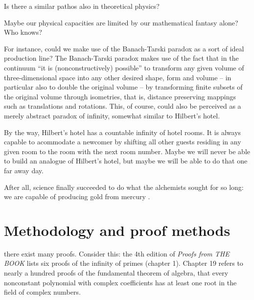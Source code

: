 Is there a similar pathos also in theoretical physics?

Maybe our physical capacities are limited by our mathematical fantasy alone?
Who knows?

For instance, could we make use of the Banach-Tarski paradox \cite{springerlink:10.1007/BF03023740,wagon1}
as a sort of ideal production line?
The Banach-Tarski paradox makes use of the fact that in the continuum
``it is (nonconstructively) possible'' to transform any given volume of three-dimensional space into any other desired shape, form and volume
-- in particular also to double the original volume -- by
transforming finite subsets of the original volume
through isometries, that is, distance preserving mappings such as translations and rotations.
This, of course, could also be perceived as a merely abstract paradox of infinity, somewhat similar to Hilbert's hotel.

By the way,
Hilbert's hotel \cite{rucker} has a countable infinity of hotel rooms.
It is always capable to acommodate a newcomer by shifting all other guests residing in any given room
to the room with the next room number.
Maybe we will never be able to build an analogue of Hilbert's hotel, but maybe we will
be able to do that one far away day.

After all, science finally succeeded to do what the alchemists sought for so long:
we are capable of producing gold from mercury \cite{PhysRev.60.473}.

\begin{center}
{\color{lightgray}   \Huge
\aldine
}
\end{center}


\chapter{Methodology and proof methods}
\label{ch:mpm}

 there exist many proofs.
Consider this: the 4th edition of {\em Proofs from THE BOOK}  \cite{ziegler-aigner}
lists six proofs
of the infinity of primes (chapter 1).
Chapter 19 refers to nearly a hundred proofs of the fundamental theorem
of algebra, that every nonconstant polynomial with complex coefficients has at least
one root in the field of complex numbers.

